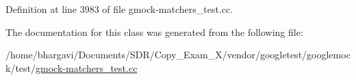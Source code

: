 Definition at line 3983 of file gmock-\/matchers\+\_\+test.\+cc.



The documentation for this class was generated from the following file\+:\begin{DoxyCompactItemize}
\item 
/home/bhargavi/\+Documents/\+S\+D\+R/\+Copy\+\_\+\+Exam\+\_\+X/vendor/googletest/googlemock/test/\hyperlink{gmock-matchers__test_8cc}{gmock-\/matchers\+\_\+test.\+cc}\end{DoxyCompactItemize}
